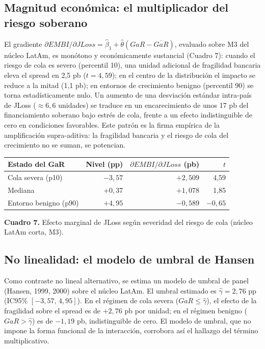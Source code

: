 \documentclass[5p,times,twocolumn,authoryear]{elsarticle}
\begin{document}
\subsection{Magnitud económica: el multiplicador del riesgo soberano}

El gradiente $\partial EMBI/\partial JLoss = \hat\beta_1+\hat\theta(GaR-\overline{GaR})$, evaluado sobre M3 del núcleo LatAm, es monótono y económicamente sustancial (Cuadro 7): cuando el riesgo de cola es severo (percentil 10), una unidad adicional de fragilidad bancaria eleva el spread en 2,5 pb ($t=4{,}59$); en el centro de la distribución el impacto se reduce a la mitad (1,1 pb); en entornos de crecimiento benigno (percentil 90) se torna estadísticamente nulo. Un aumento de una desviación estándar intra-país de JLoss ($\approx6{,}6$ unidades) se traduce en un encarecimiento de unos 17 pb del financiamiento soberano bajo estrés de cola, frente a un efecto indistinguible de cero en condiciones favorables. Este patrón es la firma empírica de la amplificación supra-aditiva: la fragilidad bancaria y el riesgo de cola del crecimiento no se suman, se potencian.

\begin{center}
\footnotesize
\begin{tabular}{lrrr}
\toprule
Estado del GaR & Nivel (pp) & $\partial EMBI/\partial JLoss$ (pb) & $t$ \\
\midrule
Cola severa (p10)   & $-3,57$ & $+2,509$ & 4,59 \\
Mediana              & $+0,37$ & $+1,078$ & 1,85 \\
Entorno benigno (p90)& $+4,95$ & $-0,589$ & $-0,65$ \\
\bottomrule
\end{tabular}

\medskip
\footnotesize\textbf{Cuadro 7.} Efecto marginal de JLoss según severidad del riesgo de cola (núcleo LatAm corta, M3).
\end{center}

\subsection{No linealidad: el modelo de umbral de Hansen}

Como contraste no lineal alternativo, se estima un modelo de umbral de panel (Hansen, 1999, 2000) sobre el núcleo LatAm. El umbral estimado es $\hat\gamma=2{,}76$ pp (IC95\% $[-3{,}57,\,4{,}95]$). En el régimen de cola severa ($GaR\le\hat\gamma$), el efecto de la fragilidad sobre el spread es de $+2{,}76$ pb por unidad; en el régimen benigno ($GaR>\hat\gamma$) es de $-1{,}19$ pb, indistinguible de cero. El modelo de umbral, que no impone la forma funcional de la interacción, corrobora así el hallazgo del término multiplicativo.
\end{document}
